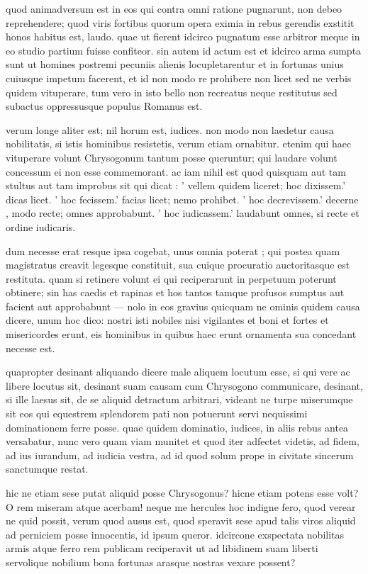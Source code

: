  quod animadversum est in eos qui contra omni ratione pugnarunt, non debeo reprehendere; quod viris fortibus quorum opera eximia in rebus gerendis exstitit honos habitus est, laudo. quae ut fierent idcirco pugnatum esse arbitror meque in eo studio partium fuisse confiteor. sin autem id actum est et idcirco arma sumpta sunt ut homines postremi pecuniis alienis locupletarentur et in fortunas unius cuiusque impetum facerent, et id non modo re prohibere non licet sed ne verbis quidem vituperare, tum vero in isto bello non recreatus neque restitutus sed subactus oppressusque populus Romanus est.

 verum longe aliter est; nil horum est, iudices. non modo non laedetur causa nobilitatis, si istis hominibus resistetis, verum etiam ornabitur. etenim qui haec vituperare volunt Chrysogonum tantum posse queruntur; qui laudare volunt concessum ei non esse commemorant. ac iam nihil est quod quisquam aut tam stultus aut tam improbus sit qui dicat : ' vellem quidem liceret; hoc dixissem.' dicas licet. ' hoc fecissem.' facias licet; nemo prohibet. ' hoc decrevissem.' decerne , modo recte; omnes approbabunt. ' hoc iudicassem.' laudabunt omnes, si recte et ordine iudicaris.

 dum necesse erat resque ipsa cogebat, unus omnia poterat ; qui postea quam magistratus creavit legesque constituit, sua cuique procuratio auctoritasque est restituta. quam si retinere volunt ei qui reciperarunt in perpetuum poterunt obtinere; sin has caedis et rapinas et hos tantos tamque profusos sumptus aut facient aut approbabunt — nolo in eos gravius quicquam ne ominis quidem causa dicere, unum hoc dico: nostri isti nobiles nisi vigilantes et boni et fortes et misericordes erunt, eis hominibus in quibus haec erunt ornamenta sua concedant necesse est.

 quapropter desinant aliquando dicere male aliquem locutum esse, si qui vere ac libere locutus sit, desinant suam causam cum Chrysogono communicare, desinant, si ille laesus sit, de se aliquid detractum arbitrari, videant ne turpe miserumque sit eos qui equestrem splendorem pati non potuerunt servi nequissimi dominationem ferre posse. quae quidem dominatio, iudices, in aliis rebus antea versabatur, nunc vero quam viam munitet et quod iter adfectet videtis, ad fidem, ad ius iurandum, ad iudicia vestra, ad id quod solum prope in civitate sincerum sanctumque restat.

 hic ne etiam sese putat aliquid posse Chrysogonus? hicne etiam potens esse volt? O rem miseram atque acerbam! neque me hercules hoc indigne fero, quod verear ne quid possit, verum quod ausus est, quod speravit sese apud talis viros aliquid ad perniciem posse innocentis, id ipsum queror. idcircone exspectata nobilitas armis atque ferro rem publicam reciperavit ut ad libidinem suam liberti servolique nobilium bona fortunas arasque nostras vexare possent?

